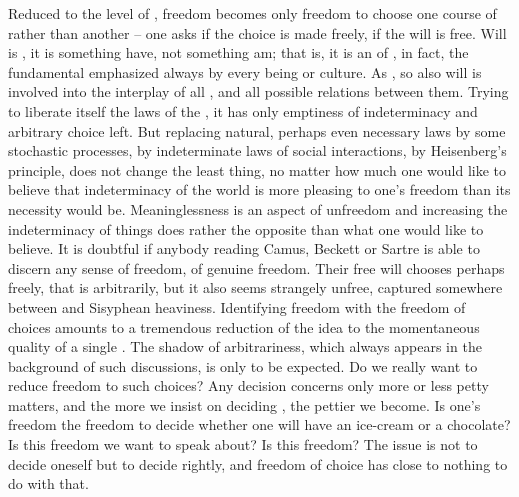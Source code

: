 Reduced to the level of , freedom becomes only freedom to choose
one course of  rather than another -- one asks if the choice is made
freely, if the will is free. 
Will is , it is something  have, not something  am; that
is, it is an  of , in fact, the fundamental  
emphasized always by every  being or culture.  As
, so also will is involved into the interplay of all , and all possible relations between them. Trying to liberate
itself  the  laws of the , it has only
emptiness of indeterminacy and arbitrary choice left.  But replacing natural,
perhaps even necessary laws by some stochastic processes, by indeterminate laws
of social interactions, by Heisenberg's principle, does not change the least
thing, no matter how much one would like to believe that indeterminacy of the
world is more pleasing to one's freedom than its necessity would be.
Meaninglessness is an aspect of unfreedom and increasing the indeterminacy of
things does rather the opposite than what one would like to believe. It is doubtful if anybody reading Camus, Beckett or Sartre is able to
discern any sense of freedom, of genuine freedom.  Their free will chooses
perhaps freely, that is arbitrarily, but it also seems strangely unfree,
captured somewhere between  and Sisyphean heaviness.
Identifying freedom with the freedom of %
choices amounts to a tremendous reduction of the idea to the momentaneous
quality of a single . The shadow of arbitrariness, which always appears
in the background of such discussions, is only to be expected.  Do we really
want to reduce freedom to such  choices? Any  decision
concerns only more or less petty matters, and the more we insist on deciding
, the pettier we become. Is one's freedom the freedom to decide
whether one will have an ice-cream or a chocolate?  Is this freedom we want to
speak about? Is this freedom? The issue is not to decide oneself but to decide
rightly, and freedom of choice has close to nothing to do with that.

